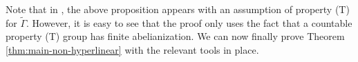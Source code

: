 \documentclass[11pt]{amsart}
\newcommand{\R}{{\mathbb{R}}}
\theoremstyle{definition}
\theoremstyle{remark}
\theoremstyle{definition}
\newcommand{\admid}[1]{\begingroup\color{orange}Alon: #1\endgroup}
\begin{document}
Note that in \cite{Dog}, the above proposition appears with an assumption of property (T) for $\widetilde{\Gamma}$.
However, it is easy to see that the proof only uses the fact that a countable property (T) group has finite abelianization.
%   
%   
We can now finally prove Theorem \ref{thm:main-non-hyperlinear} with the relevant tools in place.
\end{document}
